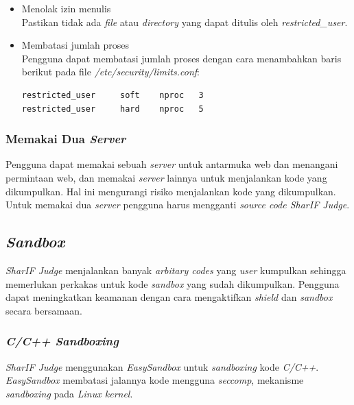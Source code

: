 \documentclass[a4paper,twoside]{article}
\begin{document}
\begin{enumerate}
\begin{itemize}
			\item Menolak izin menulis \\
			Pastikan tidak ada \textit{file} atau \textit{directory} yang dapat ditulis oleh \textit{restricted\_user}.
			
			\item Membatasi jumlah proses \\
			Pengguna dapat membatasi jumlah proses dengan cara menambahkan baris berikut pada file \textit{/etc/security/limits.conf}:
			
			\begin{lstlisting}[basicstyle=\ttfamily, frame=single,
			columns=fullflexible, keepspaces=true, breaklines=true, label=ls:17]
restricted_user     soft    nproc   3
restricted_user     hard    nproc   5
			\end{lstlisting}
			
		\end{itemize}
		
		\subsubsection*{Memakai Dua \textit{Server}}
		\label{subsubsec:memakai_dua_server}
		Pengguna dapat memakai sebuah \textit{server} untuk antarmuka web dan menangani permintaan web, dan memakai \textit{server} lainnya untuk menjalankan kode yang dikumpulkan. Hal ini mengurangi risiko menjalankan kode yang dikumpulkan. Untuk memakai dua \textit{server} pengguna harus mengganti \textit{source code SharIF Judge}. 
		
		
		\subsection*{\textit{Sandbox}}
		\label{subsec:sandbox}
		\textit{SharIF Judge} menjalankan banyak \textit{arbitary codes} yang \textit{user} kumpulkan sehingga memerlukan perkakas untuk kode \textit{sandbox} yang sudah dikumpulkan. Pengguna dapat meningkatkan keamanan dengan cara mengaktifkan \textit{shield} dan \textit{sandbox} secara bersamaan.
		
		\subsubsection*{\textit{C/C++ Sandboxing}}
		\label{subsubsec:sandbox_c/c++}
		\textit{SharIF Judge} menggunakan \textit{EasySandbox} untuk \textit{sandboxing} kode \textit{C/C++}. \textit{EasySandbox} membatasi jalannya kode mengguna \textit{seccomp}, mekanisme \textit{sandboxing} pada \textit{Linux kernel}.
		

\end{enumerate}
\end{document}
